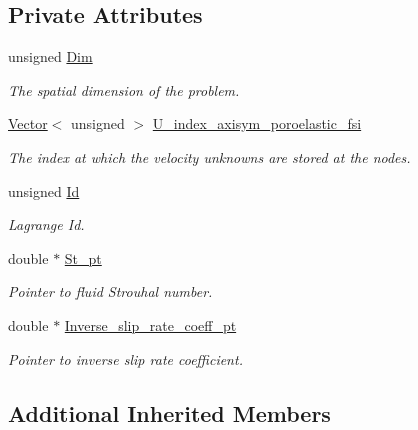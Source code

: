 \subsection*{Private Attributes}
\begin{DoxyCompactItemize}
\item 
unsigned \hyperlink{classoomph_1_1LinearisedAxisymPoroelasticBJS__FSIElement_aedc72faae236c037c4bf80efb8899a78}{Dim}
\begin{DoxyCompactList}\small\item\em The spatial dimension of the problem. \end{DoxyCompactList}\item 
\hyperlink{classoomph_1_1Vector}{Vector}$<$ unsigned $>$ \hyperlink{classoomph_1_1LinearisedAxisymPoroelasticBJS__FSIElement_a98bb2834379b10c46d90d66537cee1d7}{U\+\_\+index\+\_\+axisym\+\_\+poroelastic\+\_\+fsi}
\begin{DoxyCompactList}\small\item\em The index at which the velocity unknowns are stored at the nodes. \end{DoxyCompactList}\item 
unsigned \hyperlink{classoomph_1_1LinearisedAxisymPoroelasticBJS__FSIElement_a50d6dc255c2c8275dda14fd1883af355}{Id}
\begin{DoxyCompactList}\small\item\em Lagrange Id. \end{DoxyCompactList}\item 
double $\ast$ \hyperlink{classoomph_1_1LinearisedAxisymPoroelasticBJS__FSIElement_a3a754eeab45d9d14b81173fb33a57ec4}{St\+\_\+pt}
\begin{DoxyCompactList}\small\item\em Pointer to fluid Strouhal number. \end{DoxyCompactList}\item 
double $\ast$ \hyperlink{classoomph_1_1LinearisedAxisymPoroelasticBJS__FSIElement_a64848a4d49c1824b990abf592b5ec78b}{Inverse\+\_\+slip\+\_\+rate\+\_\+coeff\+\_\+pt}
\begin{DoxyCompactList}\small\item\em Pointer to inverse slip rate coefficient. \end{DoxyCompactList}\end{DoxyCompactItemize}
\subsection*{Additional Inherited Members}


